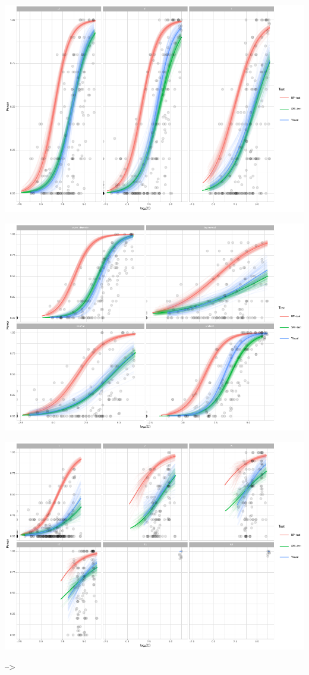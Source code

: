\documentclass[]{interact}
\theoremstyle{plain}%
\theoremstyle{definition}
\theoremstyle{remark}
\begin{document}
\includegraphics{paper_comparison_files/figure-latex/unnamed-chunk-16-1.pdf}

\includegraphics{paper_comparison_files/figure-latex/unnamed-chunk-17-1.pdf}

\includegraphics{paper_comparison_files/figure-latex/unnamed-chunk-18-1.pdf}

--\textgreater{}



\end{document}
